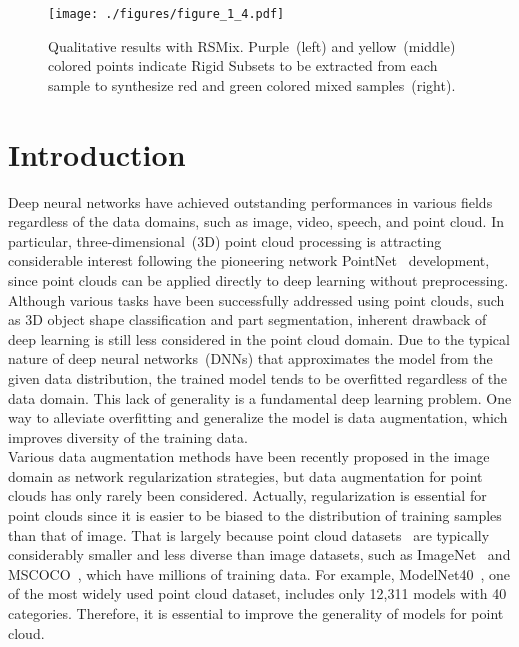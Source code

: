 \documentclass[final]{cvpr}
\begin{document}
\begin{figure}[t!]
\texttt{[image: ./figures/figure\_1\_4.pdf]} 
\caption{Qualitative results with RSMix. Purple~(left) and yellow~(middle) colored points indicate Rigid Subsets to be extracted from each sample to synthesize red and green colored mixed samples~(right).}
\vspace{-0.5cm}
      \label{fig:representative_figure}
\end{figure}



\section{Introduction} \label{section:Introduction}
Deep neural networks have achieved outstanding performances in various fields regardless of the data domains, such as image, video, speech, and point cloud. In particular, three-dimensional~(3D) point cloud processing is attracting considerable interest following the pioneering network PointNet~\cite{qi2017pointnet} development, since point clouds can be applied directly to deep learning without preprocessing. Although various tasks have been successfully addressed using point clouds, such as 3D object shape classification and part segmentation, inherent drawback of deep learning is still less considered in the point cloud domain.
Due to the typical nature of deep neural networks~(DNNs) that approximates the model from the given data distribution, the trained model tends to be overfitted regardless of the data domain. This lack of generality is a fundamental deep learning problem. One way to alleviate overfitting and generalize the model is data augmentation, which improves diversity of the training data.\\
\indent Various data augmentation methods have been recently proposed in the image domain as network regularization strategies, but data augmentation for point clouds has only rarely been considered. Actually, regularization is essential for point clouds since it is easier to be biased to the distribution of training samples than that of image. That is largely because point cloud datasets~\cite{wu20153d,chang2015shapenet,dai2017scannet} are typically considerably smaller and less diverse than image datasets, such as ImageNet~\cite{deng2009imagenet} and MSCOCO~\cite{lin2014microsoft}, which have millions of training data. For example, ModelNet40~\cite{wu20153d}, one of the most widely used point cloud dataset, includes only 12,311 models with 40 categories. Therefore, it is essential to improve the generality of models for point cloud.\\
\end{document}
